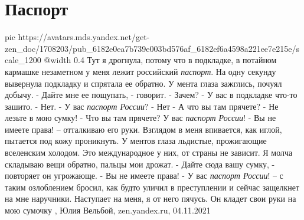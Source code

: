  
 
 
 
 
\chapter{Паспорт}
\label{sec:slova.passport}

\ifcmt
  pic https://avatars.mds.yandex.net/get-zen_doc/1708203/pub_6182e0ea7b739e003bd576af_6182ef6a4598a221ee7e215e/scale_1200
  @width 0.4
\fi
Тут я дрогнула, потому что в подкладке, в потайном кармашке незаметном у меня
лежит российский \emph{паспорт}. На одну секунду вывернула подкладку и спрятала
ее обратно. У мента глаза зажглись, почуял добычу.  - Дайте мне ее пощупать, -
говорит.  - Зачем?  - У вас в подкладке что-то зашито.  - Нет.  - У вас
\emph{паспорт России}?  - Нет - А что вы там прячете?  - Не лезьте в мою сумку!
- Что вы там прячете? У вас \emph{паспорт России}!  - Вы не имеете права! –
отталкиваю его руки.  Взглядом в меня впивается, как иглой, пытается под кожу
проникнуть. У ментов глаза льдистые, прожигающие вселенским холодом. Это
международное у них, от страны не зависит.  Я молча складываю вещи обратно,
пальцы мои дрожат.  - Дайте сюда вашу сумку, - повторяет он угрожающе.  - Вы не
имеете права!  - У вас \emph{паспорт России}! – с таким озлоблением бросил, как
будто уличил в преступлении и сейчас защелкнет на мне наручники.  Наступает на
меня, я от него пячусь. Он кладет свои руки на мою сумочку
, 
Юлия Вельбой, zen.yandex.ru, 04.11.2021 
